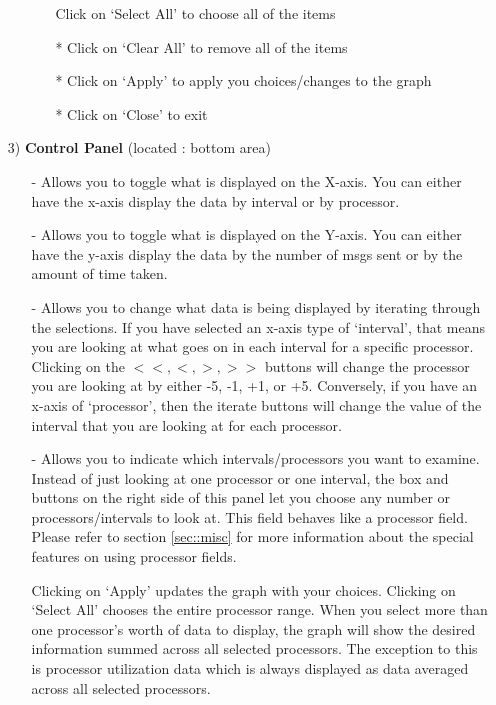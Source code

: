 \documentclass[10pt]{article}
\begin{document}
\begin{enumerate}
\begin{itemize}
\begin{itemize}
      Click on `Select All' to choose all of the items
      \item[*]
      Click on `Clear All' to remove all of the items
      \item[*]
      Click on `Apply' to apply you choices/changes to the graph
      \item[*]
      Click on `Close' to exit
      \end{itemize}
   \end{itemize}
\item[3)]
{\bf Control Panel} (located : bottom area)
   \begin{itemize}
   \item[-]
   Allows you to toggle what is displayed on the X-axis.  You can either
   have the x-axis display the data by interval or by processor.
   \item[-]
   Allows you to toggle what is displayed on the Y-axis.  You can
   either have the y-axis display the data by the number of msgs sent
   or by the amount of time taken.
   \item[-]
   Allows you to change what data is being displayed by iterating
   through the selections.  If you have selected an x-axis type of
   `interval', that means you are looking at what goes on in each
   interval for a specific processor.  Clicking on the $<<, <, >, >>$
   buttons will change the processor you are looking at by either -5,
   -1, +1, or +5.  Conversely, if you have an x-axis of `processor',
   then the iterate buttons will change the value of the interval that
   you are looking at for each processor.
   \item[-]
   Allows you to indicate which intervals/processors you want to
   examine.  Instead of just looking at one processor or one interval,
   the box and buttons on the right side of this panel let you choose
   any number or processors/intervals to look at. This field behaves
   like a processor field. Please refer to section \ref{sec::misc} 
   for more information about the special features on using processor
   fields.

   Clicking on `Apply' updates the graph with your choices. Clicking
   on `Select All' chooses the entire processor range.  When you
   select more than one processor's worth of data to display, the
   graph will show the desired information summed across all selected
   processors. The exception to this is processor utilization data
   which is always displayed as data averaged across all selected
   processors.
   \end{itemize}
\end{enumerate}
\end{document}
